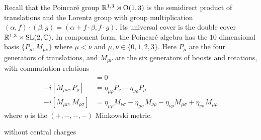 Recall that the Poincar\'e group $\mathbb{R}^{1,3} \rtimes {\operatorname{O}}(1,3)$ is the 
semidirect product of translations and the Lorentz group with group
multiplication $(\alpha,f) \cdot (\beta, g) = (\alpha + f\cdot \beta, f\cdot
g)$. Its universal cover is the double cover  $\mathbb{R}^{1,3}\rtimes
\operatorname{SL}(2,\mathbb{C})$. In component form, the Poincar\'e algebra has the 10
dimensional basis $\{P_\mu,M_{\mu\nu}\}$ where $\mu<\nu$ and  $\mu,\nu\in
\{0,1,2,3\}$. Here  $P_\mu$ are the four generators of translations, and
$M_{\mu\nu}$ are the six generators of boosts and rotations, with commutation relations
\begin{align*}
	[P_\mu, P_\nu] &= 0 \\
	-i[M_{\mu\nu}, P_{\rho}] &= \eta_{\mu\rho}P_{\nu} - \eta_{\nu\rho}P_{\mu} \\
	-i[M_{\mu\nu}, M_{\rho\sigma}] &= \eta_{\mu\rho}M_{\nu\sigma} -
	\eta_{\mu\sigma}M_{\nu\rho} - \eta_{\nu\rho}M_{\mu\sigma} +
	\eta_{\nu\sigma}M_{\mu\rho} 
\end{align*}
where $\eta$ is the  $(+,-,-,-)$ Minkowski metric. 

\begin{comment} %
	From the previous section, we know the Lorentz group admits two inequivalent 
	two-dimensional complex spin representations 2 and $\overline{2}$ whose tensor 
	product decomposes as $2\otimes\overline{2} \simeq 3 \oplus 1$, to give the
	adjoint representation. 
	Normally, we treat such a decomposition as relating to specific particles,
	e.g. the pion is a quark and anti-quark pair. However, we can also identify
	$3\oplus 1$ with Minkowski spacetime. 

	This leads to the question: if Minkowski spacetime belongs to the adjoint
	representation, can Poincar\'e symmetry be extended to the fundamental
	representation? 

	The physical appeal of this idea is that the fundamental representations
	correspond to fermions. 
	So far, however, the implied supersymmetry here,
	of a symmetry between spatial and fermionic directions, has not been seen
	experimentally in nature. 
\end{comment}

without central charges

